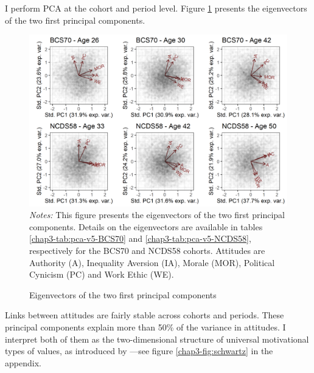%
I perform PCA at the cohort and period level. Figure \ref{chap3-fig:data-pca-v5} presents the eigenvectors of the two first principal components.
\begin{figure}[!tb]
    \centering
    \caption{Eigenvectors of the two first principal components}
    \label{chap3-fig:data-pca-v5}
    \includegraphics[width=\linewidth]{chap3/graphic/pca-v5.png}
    \hrulefill
	\vspace{-3em}
	\justify\singlespacing\footnotesize{\textit{Notes:} This figure presents the eigenvectors of the two first principal components. Details on the eigenvectors are available in tables \ref{chap3-tab:pca-v5-BCS70} and \ref{chap3-tab:pca-v5-NCDS58}, respectively for the BCS70 and NCDS58 cohorts. Attitudes are Authority (A), Inequality Aversion (IA), Morale (MOR), Political Cynicism (PC) and Work Ethic (WE).}
\end{figure}
Links between attitudes are fairly stable across cohorts and periods. These principal components explain more than 50\% of the variance in attitudes. I interpret both of them as the two-dimensional structure of universal motivational types of values, as introduced by \citet{Schwartz1992Universals, Schwartz2012Overview}---see figure \ref{chap3-fig:schwartz} in the appendix.

